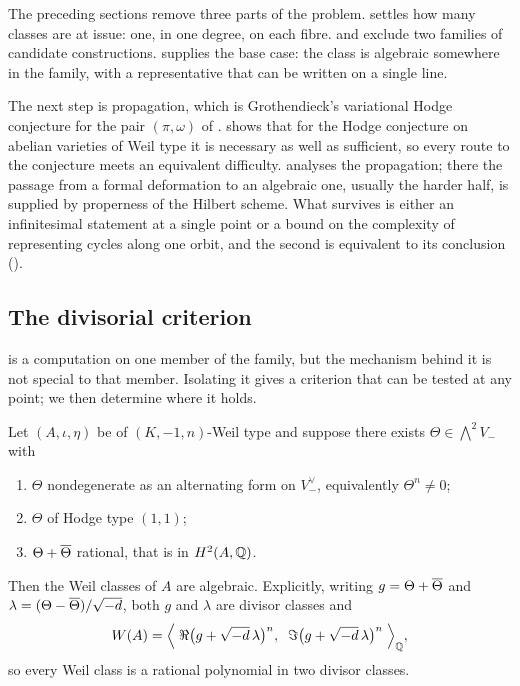 \begin{remark}\label{rem:target}
The preceding sections remove three parts of the problem.
 settles how many classes are at issue: one, in one
degree, on each fibre.  and  exclude
two families of candidate constructions.  supplies the
base case: the class is algebraic somewhere in the family, with a
representative that can be written on a single line.

The next step is propagation, which is Grothendieck's variational Hodge
conjecture for the pair $(\pi,\omega)$ of .
 shows that for the Hodge conjecture on
abelian varieties of Weil type it is necessary as well as sufficient, so every
route to the conjecture meets an equivalent difficulty.
 analyses the propagation; there the passage from a
formal deformation to an algebraic one, usually the harder half, is supplied
by properness of the Hilbert scheme. What survives is either an infinitesimal
statement at a single point or a bound on the complexity of representing
cycles along one orbit, and the second is equivalent to its conclusion
().
\end{remark}

\subsection{The divisorial criterion}
\label{ssec:divcrit}

 is a computation on one member of the family, but the
mechanism behind it is not special to that member. Isolating it gives a
criterion that can be tested at any point; we then determine where it holds.

\begin{theorem}\label{thm:divcriterion}
Let $(A,\iota,\eta)$ be of $(K,-1,n)$-Weil type and suppose there exists
$\Theta\in\bigwedge^{2}V_{-}$ with
\begin{enumerate}[label=\textup{(\roman*)},nosep]
\item $\Theta$ nondegenerate as an alternating form on $V_{-}^{\vee}$,
  equivalently $\Theta^{n}\ne0$;
\item $\Theta$ of Hodge type $(1,1)$;
\item $\Theta+\overline{\Theta}$ rational, that is in $H^{2}(A,\mathbb{Q})$.
\end{enumerate}
Then the Weil classes of $A$ are algebraic. Explicitly, writing
$g=\Theta+\overline{\Theta}$ and $\lambda=(\Theta-\overline{\Theta})/\sqrt{-d}$, both
$g$ and $\lambda$ are divisor classes and
\begin{equation}\label{eq:divrep}
  W(A)=\Bigl\langle\;
    \Re\bigl(g+\sqrt{-d}\,\lambda\bigr)^{n},\;\;
    \Im\bigl(g+\sqrt{-d}\,\lambda\bigr)^{n}\;\Bigr\rangle_{\mathbb{Q}},
\end{equation}
so every Weil class is a rational polynomial in two divisor classes.
\end{theorem}

